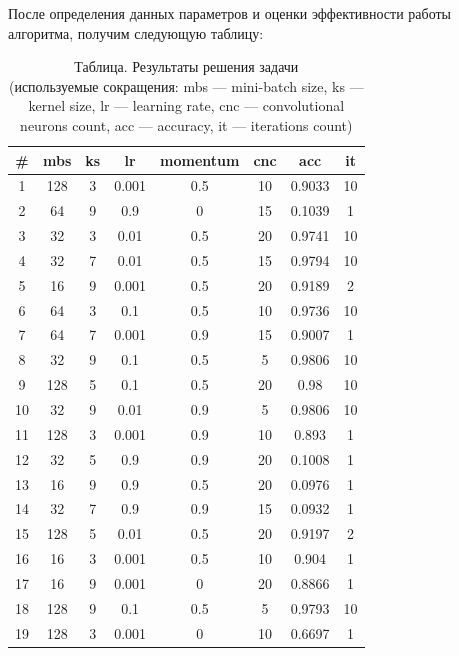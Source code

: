 \begin{textitemize}
После определения данных параметров и оценки эффективности работы алгоритма, получим следующую таблицу:

\begin{table}[ht]
	\caption{Таблица. Результаты решения задачи \\(используемые сокращения: mbs --- mini-batch size, ks --- kernel size, lr --- learning rate, cnc --- convolutional neurons count, acc --- accuracy, it --- iterations count)}
	\centering
	\begin{tabular}{c c c c c c c c}
		\hline\hline
		\# & mbs & ks & lr    & momentum & cnc & acc    & it \\ [0.5ex] %
		\hline
		1        & 128 & 3  & 0.001 & 0.5      & 10  & 0.9033 & 10 \\
		2        & 64  & 9  & 0.9   & 0        & 15  & 0.1039 & 1  \\
		3        & 32  & 3  & 0.01  & 0.5      & 20  & 0.9741 & 10 \\
		4        & 32  & 7  & 0.01  & 0.5      & 15  & 0.9794 & 10 \\
		5        & 16  & 9  & 0.001 & 0.5      & 20  & 0.9189 & 2  \\
		6        & 64  & 3  & 0.1   & 0.5      & 10  & 0.9736 & 10 \\
		7        & 64  & 7  & 0.001 & 0.9      & 15  & 0.9007 & 1  \\
		8        & 32  & 9  & 0.1   & 0.5      & 5   & 0.9806 & 10 \\
		9        & 128 & 5  & 0.1   & 0.5      & 20  & 0.98   & 10 \\
		10       & 32  & 9  & 0.01  & 0.9      & 5   & 0.9806 & 10 \\
		11       & 128 & 3  & 0.001 & 0.9      & 10  & 0.893  & 1  \\
		12       & 32  & 5  & 0.9   & 0.9      & 20  & 0.1008 & 1  \\
		13       & 16  & 9  & 0.9   & 0.5      & 20  & 0.0976 & 1  \\
		14       & 32  & 7  & 0.9   & 0.9      & 15  & 0.0932 & 1  \\
		15       & 128 & 5  & 0.01  & 0.5      & 20  & 0.9197 & 2  \\
		16       & 16  & 3  & 0.001 & 0.5      & 10  & 0.904  & 1  \\
		17       & 16  & 9  & 0.001 & 0        & 20  & 0.8866 & 1  \\
		18       & 128 & 9  & 0.1   & 0.5      & 5   & 0.9793 & 10 \\
		19       & 128 & 3  & 0.001 & 0        & 10  & 0.6697 & 1  \\

\end{tabular}
\end{table}
\end{textitemize}

